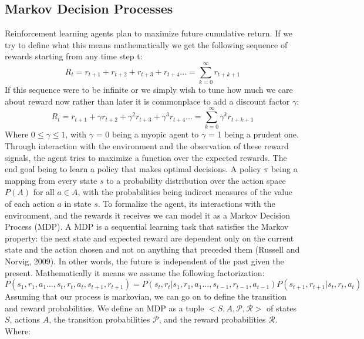 \documentclass[a4paper,12pt]{proposal}
\begin{document}
\subsection{Markov Decision Processes}
Reinforcement learning agents plan to maximize future cumulative return. If we try to define what this means mathematically we get the following sequence of rewards starting from any time step t:
\begin{equation}
R_t = r_{t+1} + r_{t+2} + r_{t+3} + r_{t+4}\ldots = \sum_{k=0}^\infty r_{t+k+1}
\end{equation}
If this sequence were to be infinite or we simply wish to tune how much we care about reward now rather than later it is commonplace to add a discount factor \(\gamma\):
\begin{equation}
R_t = r_{t+1} + \gamma r_{t+2} + \gamma^2 r_{t+3} + \gamma^3 r_{t+4}\ldots = \sum_{k=0}^\infty \gamma^k r_{t+k+1}
\end{equation}
Where \(0 \leq \gamma \leq 1\), with \(\gamma\) = 0 being a myopic agent to \(\gamma\) = 1 being a prudent one. Through interaction with the environment and the observation of these reward signals, the agent tries to maximize a function over the expected rewards. The end goal being to learn a policy that makes optimal decisions. A policy \(\pi\) being a mapping from every state \(s\) to a probability distribution over the action space \(P(A)\) for all \(a\in A\), with the probabilities being indirect measures of the value of each action \(a\) in state \(s\). 
To formalize the agent, its interactions with the environment, and the rewards it receives we can model it as a Markov Decision Process (MDP). A MDP is a sequential learning task that satisfies the Markov property: the next state and expected reward are dependent only on the current state and the action chosen and not on anything that preceded them (Russell and Norvig, 2009). In other words, the future is independent of the past given the present. Mathematically it means we assume the following factorization:
\begin{equation}
P(s_1, r_1, a_1 \ldots , s_t, r_t, a_t, s_{t+1}, r_{t+1}) = P(s_t, r_t | s_1, r_1, a_1 \ldots , s_{t-1}, r_{t-1}, a_{t-1}) P(s_{t+1}, r_{t+1} | s_t, r_t, a_t)
\end{equation}
Assuming that our process is markovian, we can go on to define the transition and reward probabilities. We define an MDP as a tuple \(<S,A,\mathcal{P},\mathcal{R}>\) of states \(S\), actions \(A\), the transition probabilities \(\mathcal{P}\), and the reward probabilities \(\mathcal{R}\). Where:
\end{document}
